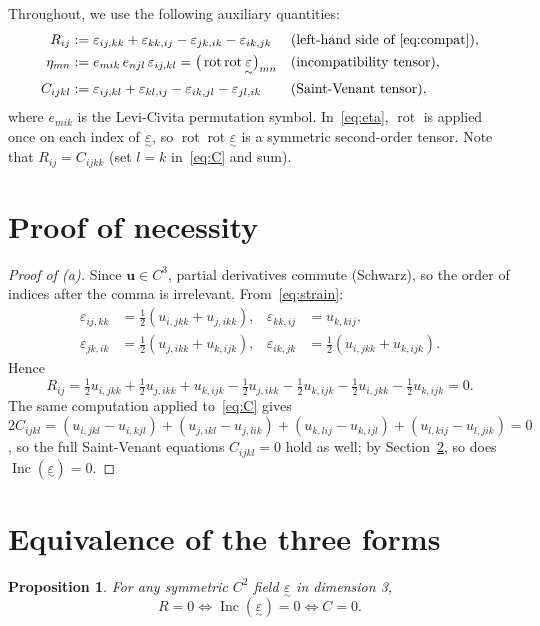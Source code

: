 \documentclass[11pt,a4paper]{article}
\newtheorem{proposition}{Proposition}
\theoremstyle{remark}
\newcommand{\eps}{\varepsilon}
\newcommand{\teps}{\underset{\sim}{\varepsilon}}
\newcommand{\rot}{\operatorname{rot}}
\newcommand{\Inc}{\operatorname{Inc}}
\begin{document}
Throughout, we use the following auxiliary quantities:
\begin{align}
  R_{ij} &:= \eps_{ij,kk}+\eps_{kk,ij}-\eps_{jk,ik}-\eps_{ik,jk}
          &&\text{(left-hand side of \eqref{eq:compat})},\label{eq:R}\\
  \eta_{mn} &:= e_{mik}\,e_{njl}\,\eps_{ij,kl} = \big(\rot\rot\teps\big)_{mn}
          &&\text{(incompatibility tensor)},\label{eq:eta}\\
  C_{ijkl} &:= \eps_{ij,kl}+\eps_{kl,ij}-\eps_{ik,jl}-\eps_{jl,ik}
          &&\text{(Saint-Venant tensor)},\label{eq:C}
\end{align}
where $e_{mik}$ is the Levi-Civita permutation symbol. In~\eqref{eq:eta}, $\rot$ is applied once on each index of $\teps$, so $\rot\rot\teps$ is a symmetric second-order tensor. Note that $R_{ij}=C_{ijkk}$ (set $l=k$ in~\eqref{eq:C} and sum).

\section{Proof of necessity}

\begin{proof}[Proof of (a)]
Since $\boldsymbol u\in C^3$, partial derivatives commute (Schwarz), so the order of indices after the comma is irrelevant. From~\eqref{eq:strain}:
\begin{align*}
  \eps_{ij,kk} &= \tfrac12\left(u_{i,jkk}+u_{j,ikk}\right), &
  \eps_{kk,ij} &= u_{k,kij},\\
  \eps_{jk,ik} &= \tfrac12\left(u_{j,ikk}+u_{k,ijk}\right), &
  \eps_{ik,jk} &= \tfrac12\left(u_{i,jkk}+u_{k,ijk}\right).
\end{align*}
Hence
\[
  R_{ij}
  = \tfrac12 u_{i,jkk}+\tfrac12 u_{j,ikk}+u_{k,ijk}
   -\tfrac12 u_{j,ikk}-\tfrac12 u_{k,ijk}
   -\tfrac12 u_{i,jkk}-\tfrac12 u_{k,ijk}
  =0 .
\]
The same computation applied to~\eqref{eq:C} gives
$2C_{ijkl}=(u_{i,jkl}-u_{i,kjl})+(u_{j,ikl}-u_{j,lik})+(u_{k,lij}-u_{k,ijl})+(u_{l,kij}-u_{l,jik})=0$,
so the full Saint-Venant equations $C_{ijkl}=0$ hold as well; by Section~\ref{sec:equiv}, so does $\Inc(\teps)=0$.
\end{proof}

\section{Equivalence of the three forms}\label{sec:equiv}

\begin{proposition}\label{prop:equiv}
For any symmetric $C^2$ field $\teps$ in dimension 3,
\[
  R=0 \iff \Inc(\teps)=0 \iff C=0 .
\]
\end{proposition}
\end{document}
